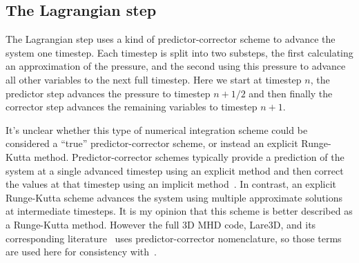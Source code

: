\subsection{The Lagrangian step}
The Lagrangian step uses a kind of predictor-corrector scheme to advance the system one timestep. Each timestep is split into two substeps, the first calculating an approximation of the pressure, and the second using this pressure to advance all other variables to the next full timestep. Here we start at timestep $n$, the predictor step advances the pressure to timestep $n+1/2$ and then finally the corrector step advances the remaining variables to timestep $n+1$.

It's unclear whether this type of numerical integration scheme could be considered a ``true'' predictor-corrector scheme, or instead an explicit Runge-Kutta method. Predictor-corrector schemes typically provide a prediction of the system at a single advanced timestep using an explicit method and then correct the values at that timestep using an implicit method~\cite{butcherNumericalMethodsOrdinary2004}. In contrast, an explicit Runge-Kutta scheme advances the system using multiple approximate solutions at intermediate timesteps. It is my opinion that this scheme is better described as a Runge-Kutta method. However the full 3D MHD code, Lare3D, and its corresponding literature~\cite{arberStaggeredGridLagrangian2001} uses predictor-corrector nomenclature, so those terms are used here for consistency with~\cite{arberStaggeredGridLagrangian2001}.

